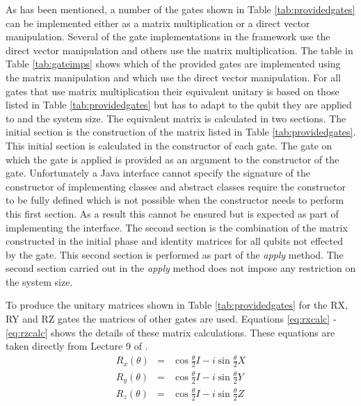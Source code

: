 As has been mentioned, a number of the gates shown in Table \ref{tab:providedgates} can be implemented either as a matrix multiplication or a direct vector manipulation.
Several of the gate implementations in the framework use the direct vector manipulation and others use the matrix multiplication.
The table in Table \ref{tab:gateimps} shows which of the provided gates are implemented using the matrix manipulation and which use the direct vector manipulation.
For all gates that use matrix multiplication their equivalent unitary is based on those listed in Table \ref{tab:providedgates} but has to adapt to the qubit they are applied to and the system size.
The equivalent matrix is calculated in two sections.
The initial section is the construction of the matrix listed in Table \ref{tab:providedgates}.
This initial section is calculated in the constructor of each gate.
The gate on which the gate is applied is provided as an argument to the constructor of the gate.
Unfortunately a Java interface cannot specify the signature of the constructor of implementing classes and abstract classes require the constructor to be fully defined which is not possible when the constructor needs to perform this first section.
As a result this cannot be ensured but is expected as part of implementing the interface.
The second section is the combination of the matrix constructed in the initial phase and identity matrices for all qubits not effected by the gate.
This second section is performed as part of the \emph{apply} method.
The second section carried out in the \emph{apply} method does not impose any restriction on the system size.

To produce the unitary matrices shown in Table \ref{tab:providedgates} for the RX, RY and RZ gates the matrices of other gates are used.
Equations \ref{eq:rxcalc} - \ref{eq:rzcalc} shows the details of these matrix calculations.
These equations are taken directly from Lecture 9 of \cite{QIPLect}.
\begin{eqnarray}
\label{eq:rxcalc}
 R_x(\theta)&=&\cos{\frac{\theta}{2}}I-i\sin{\frac{\theta}{2}}X \\
\label{eq:rycalc}
 R_y(\theta)&=&\cos{\frac{\theta}{2}}I-i\sin{\frac{\theta}{2}}Y \\
\label{eq:rzcalc}
 R_z(\theta)&=&\cos{\frac{\theta}{2}}I-i\sin{\frac{\theta}{2}}Z 
\end{eqnarray}

